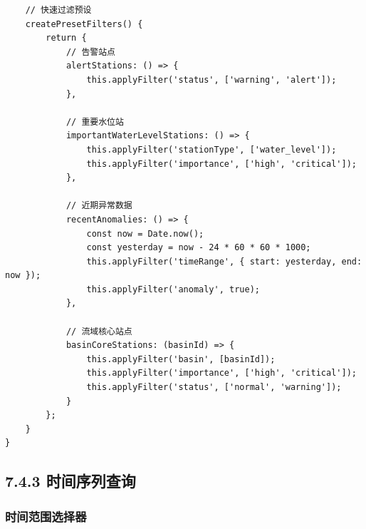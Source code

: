 \begin{lstlisting}
    // 快速过滤预设
    createPresetFilters() {
        return {
            // 告警站点
            alertStations: () => {
                this.applyFilter('status', ['warning', 'alert']);
            },
            
            // 重要水位站
            importantWaterLevelStations: () => {
                this.applyFilter('stationType', ['water_level']);
                this.applyFilter('importance', ['high', 'critical']);
            },
            
            // 近期异常数据
            recentAnomalies: () => {
                const now = Date.now();
                const yesterday = now - 24 * 60 * 60 * 1000;
                this.applyFilter('timeRange', { start: yesterday, end: now });
                this.applyFilter('anomaly', true);
            },
            
            // 流域核心站点
            basinCoreStations: (basinId) => {
                this.applyFilter('basin', [basinId]);
                this.applyFilter('importance', ['high', 'critical']);
                this.applyFilter('status', ['normal', 'warning']);
            }
        };
    }
}
\end{lstlisting}

\subsection{7.4.3
时间序列查询}\label{ux65f6ux95f4ux5e8fux5217ux67e5ux8be2}

\subsubsection{时间范围选择器}\label{ux65f6ux95f4ux8303ux56f4ux9009ux62e9ux5668}

